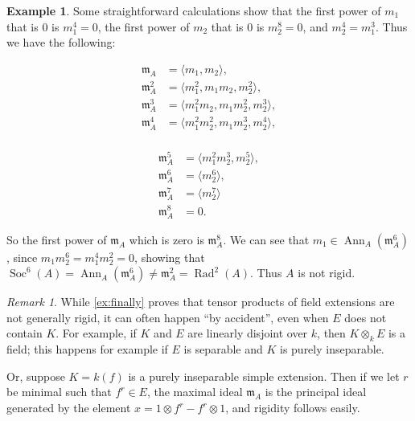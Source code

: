 \documentclass[11pt,reqno]{amsart}
\theoremstyle{definition}
\newtheorem{example}[lemma]{Example}
\theoremstyle{remark}
\newtheorem{remark}[lemma]{Remark}
\theoremstyle{definition}
\theoremstyle{plain}
\DeclareMathOperator{\Rad}{Rad}
\DeclareMathOperator{\Soc}{Soc}
\DeclareMathOperator{\Ann}{Ann}
\newcommand{\m}{\mathfrak{m}}
\begin{document}
\begin{example}
Some straightforward calculations show that the first power of $m_1$ that is $0$ is $m_1^4=0$, the first power of $m_2$ that is $0$ is $m_2^8= 0$,
and $m_2^4 = m_1^3$.
Thus we have the following:
\begin{center}\begin{minipage}[t]{0.4\textwidth}\begin{align*}
\m_A &= \langle m_1, m_2\rangle, \\
\m_A^2 &= \langle m_1^2, m_1m_2, m_2^2\rangle,\\
\m_A^3 &= \langle m_1^2m_2,m_1m_2^2,m_2^3\rangle,\\
\m_A^4 &= \langle m_1^2m_2^2,m_1m_2^3,m_2^4\rangle,\\
\end{align*}\end{minipage}
\begin{minipage}[t]{0.4\textwidth}\begin{align*}
  \m_A^5 &= \langle m_1^2m_2^3,m_2^5\rangle,\\
\m_A^6 &= \langle m_2^6\rangle,\\
\m_A^7 &= \langle m_2^7\rangle\\
\m_A^8&=0.\end{align*}
\end{minipage}\end{center}
So the first power of $\m_A$ which is zero is $\m_A^8$.
We can see that $m_1\in \Ann_A(\m_A^6)$, since $m_1m_2^6 = m_1^4m_2^2 = 0$, showing that $\Soc^6(A) = \Ann_A(\m_A^6)\neq \m_A^2 = \Rad^2(A)$.
Thus $A$ is not rigid.
\end{example}

\begin{remark}While  \cref{ex:finally} proves that tensor products of field extensions are not generally rigid, it can often happen ``by accident'', even when $E$ does not contain $K$. For example, if $K$ and $E$ are linearly disjoint over $k$, then $K\otimes_k E$ is a field; this happens for example if $E$ is separable and $K$ is purely inseparable. 
  
Or, suppose $K=k(f)$ is a purely inseparable simple extension. Then if we let $r$ be minimal such that $f^r\in E$, the maximal ideal $\m_A$ is the principal ideal generated by the element $x = 1\otimes f^r-f^r\otimes 1$, and rigidity follows easily.
 \end{remark}
\end{document}
